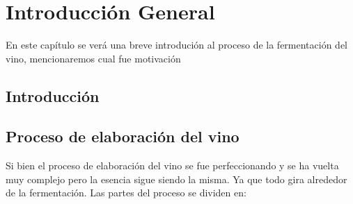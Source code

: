 
\chapter{Introducción General} %

\label{Chapter1} %
\label{IntroGeneral}

En este capítulo se verá una breve introdución al proceso de la fermentación del vino, mencionaremos cual fue motivación 


\newcommand{\keyword}[1]{\textbf{#1}}
\newcommand{\tabhead}[1]{\textbf{#1}}
\newcommand{\code}[1]{\texttt{#1}}
\newcommand{\file}[1]{\texttt{\bfseries#1}}
\newcommand{\option}[1]{\texttt{\itshape#1}}
\newcommand{\grados}{$^{\circ}$}


\section{Introducción}


\section{Proceso de elaboración del vino}
Si bien el proceso de elaboración del vino se fue perfeccionando y se ha vuelta muy complejo pero la esencia sigue siendo la misma. Ya que todo gira alrededor de la fermentación.
Las partes del proceso se dividen en:

